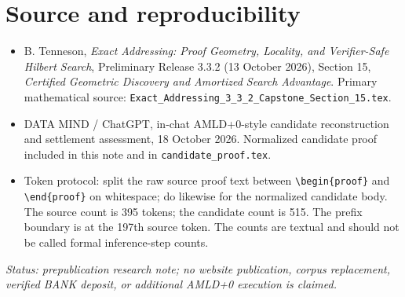 \documentclass[11pt,letterpaper]{article}
\begin{document}
\section*{Source and reproducibility}
\begin{itemize}
\item B. Tenneson, \emph{Exact Addressing: Proof Geometry, Locality, and Verifier-Safe Hilbert Search}, Preliminary Release 3.3.2 (13 October 2026), Section 15, \emph{Certified Geometric Discovery and Amortized Search Advantage}. Primary mathematical source: \texttt{Exact\_Addressing\_3\_3\_2\_Capstone\_Section\_15.tex}.
\item DATA MIND / ChatGPT, in-chat AMLD+0-style candidate reconstruction and settlement assessment, 18 October 2026. Normalized candidate proof included in this note and in \texttt{candidate\_proof.tex}.
\item Token protocol: split the raw source proof text between \verb|\begin{proof}| and \verb|\end{proof}| on whitespace; do likewise for the normalized candidate body. The source count is 395 tokens; the candidate count is 515. The prefix boundary is at the 197th source token. The counts are textual and should not be called formal inference-step counts.
\end{itemize}

\vfill\noindent\footnotesize\color{secondary}\textit{Status: prepublication research note; no website publication, corpus replacement, verified BANK deposit, or additional AMLD+0 execution is claimed.}
\end{document}
